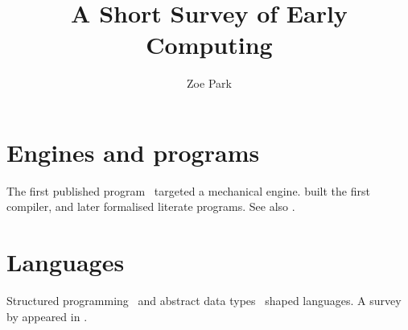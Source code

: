 \documentclass{article}
\title{A Short Survey of Early Computing}
\author{Zoe Park}
\begin{document}
\maketitle
\section{Engines and programs}
The first published program~\citep{lovelace1843} targeted a mechanical engine.
\citet{hopper1952} built the first compiler, and \citet[chap.~2]{knuth1984} later formalised
literate programs. See also \citep[e.g.,][]{dijkstra1968,hoare1969}.
\section{Languages}
Structured programming~\citep{dijkstra1968} and abstract data types~\citep{liskov1987} shaped
languages. A survey by \citeauthor{backus1978} appeared in \citeyear{backus1978}.


\end{document}
